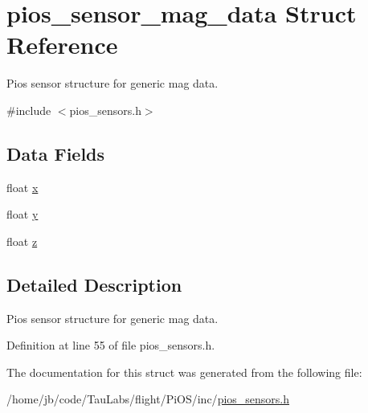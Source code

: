 \hypertarget{structpios__sensor__mag__data}{\section{pios\-\_\-sensor\-\_\-mag\-\_\-data \-Struct \-Reference}
\label{structpios__sensor__mag__data}
}


\-Pios sensor structure for generic mag data.  




{\ttfamily \#include $<$pios\-\_\-sensors.\-h$>$}

\subsection*{\-Data \-Fields}
\begin{DoxyCompactItemize}
\item 
float \hyperlink{group___p_i_o_s___s_e_n_s_o_r_s_ga3ec7375b9b8c7ab5ddd50349c76ac818}{x}
\item 
float \hyperlink{group___p_i_o_s___s_e_n_s_o_r_s_ga04a14fcd48fda39a469229e1b01c0b2d}{y}
\item 
float \hyperlink{group___p_i_o_s___s_e_n_s_o_r_s_ga77b8adea9b5e8b43c3ce7d4c60784862}{z}
\end{DoxyCompactItemize}


\subsection{\-Detailed \-Description}
\-Pios sensor structure for generic mag data. 

\-Definition at line 55 of file pios\-\_\-sensors.\-h.



\-The documentation for this struct was generated from the following file\-:\begin{DoxyCompactItemize}
\item 
/home/jb/code/\-Tau\-Labs/flight/\-Pi\-O\-S/inc/\hyperlink{pios__sensors_8h}{pios\-\_\-sensors.\-h}\end{DoxyCompactItemize}
